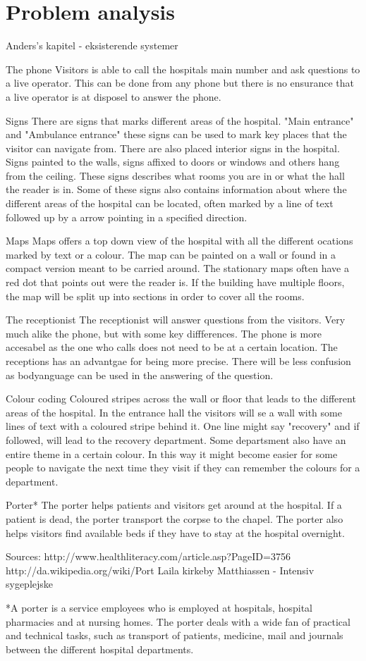 \chapter{Problem analysis}


Anders's kapitel - eksisterende systemer

The phone
Visitors is able to call the hospitals main number and ask questions to a live operator. This can be done from any phone but there is no ensurance that a live operator is at disposel to answer the phone.

Signs
There are signs that marks different areas of the hospital. "Main entrance" and "Ambulance entrance" these signs can be used to mark key places that the visitor can navigate from.
There are also placed interior signs in the hospital. Signs painted to the walls, signs affixed to doors or windows and others hang from the ceiling. These signs describes what rooms you are in or what the hall the reader is in. Some of these signs also contains information about where the different areas of the hospital can be located, often marked by a line of text followed up by a arrow pointing in a specified direction.   

Maps
Maps offers a top down view of the hospital with all the different ocations marked by text or a colour. The map can be painted on a wall or found in a compact version meant to be carried around. The stationary maps often have a red dot that points out were the reader is. If the building have multiple floors, the map will be split up into sections in order to cover all the rooms.

The receptionist
The receptionist will answer questions from the visitors. Very much alike the phone, but with some key diffferences. The phone is more accesabel as the one who calls does not need to be at a certain location. The receptions has an advantgae for being more precise. There will be less confusion as bodyanguage can be used in the answering of the question.

Colour coding
Coloured stripes across the wall or floor that leads to the different areas of the hospital. In the entrance hall the visitors will se a wall with some lines of text with a coloured stripe behind it. One line might say "recovery" and if followed, will lead to the recovery department. Some departsment also have an entire theme in a certain colour. In this way it might become easier for some people to navigate the next time they visit if they can remember the colours for a department. 

Porter*
The porter helps patients and visitors get around at the hospital. If a patient is dead, the porter transport the corpse to the chapel. The porter also helps visitors find available beds if they have to stay at the hospital overnight. 

Sources:
http://www.healthliteracy.com/article.asp?PageID=3756
http://da.wikipedia.org/wiki/Port%
Laila kirkeby Matthiassen - Intensiv sygeplejske

*A porter is a service employees who is employed at hospitals, hospital pharmacies and at nursing homes. The porter deals with a wide fan of practical and technical tasks, such as transport of patients, medicine, mail and journals between the different hospital departments.